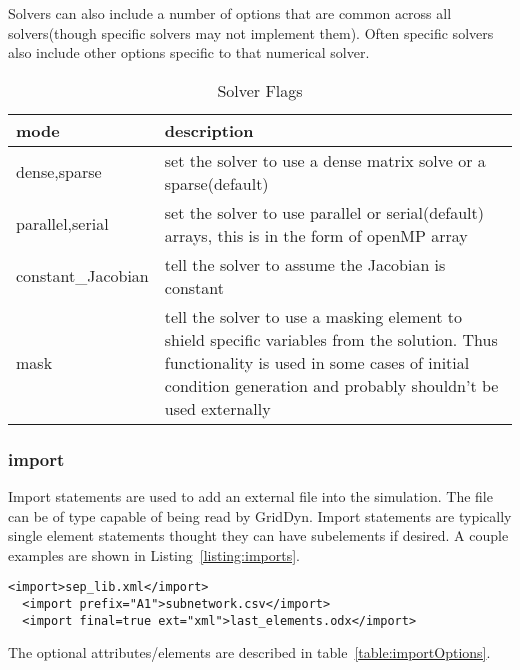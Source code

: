 \documentclass[12pt]{article} %
\begin{document}
   Solvers can also include a number of options that are common across all solvers(though specific solvers may not implement them).  Often specific solvers also include other options specific to that numerical solver.
   \begin{table}[ht]

       \caption{Solver Flags} %
       \centering %
       \begin{tabular}{l p{10cm}} %
           \hline %
           mode & description \\ [0.5ex] %
           \hline %
           dense,sparse & set the solver to use a dense matrix solve or a sparse(default) \\
           parallel,serial & set the solver to use parallel or serial(default) arrays, this is in the form of openMP array \\
           constant\_Jacobian & tell the solver to assume the Jacobian is constant \\
           mask & tell the solver to use a masking element to shield specific variables from the solution.  Thus functionality is used in some cases of initial condition generation and probably shouldn't be used externally\\
           \hline %
       \end{tabular}
       \label{table:solverFlags}
   \end{table}

  \subsubsection{import}
  Import statements are used to add an external file into the simulation.  The file can be of type capable of being read by GridDyn.
  Import statements are typically single element statements thought they can have subelements if desired.  A couple examples are shown in Listing~\ref{listing:imports}.
  \begin{lstlisting}[caption={Examples of import statements}, label={listing:imports} ]
  <import>sep_lib.xml</import>
  <import prefix="A1">subnetwork.csv</import>
  <import final=true ext="xml">last_elements.odx</import>
  \end{lstlisting}
  The optional attributes/elements are described in table~\ref{table:importOptions}.
\end{document}
